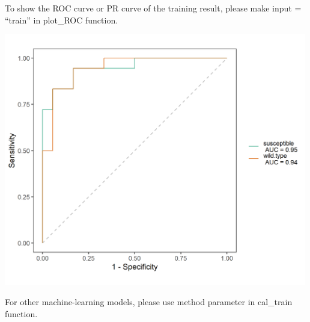 \documentclass[
]{book}
\newenvironment{Shaded}{\begin{snugshade}}{\end{snugshade}}
\newcommand{\AttributeTok}[1]{\textcolor[rgb]{0.77,0.63,0.00}{#1}}
\newcommand{\CommentTok}[1]{\textcolor[rgb]{0.56,0.35,0.01}{\textit{#1}}}
\newcommand{\DecValTok}[1]{\textcolor[rgb]{0.00,0.00,0.81}{#1}}
\newcommand{\FloatTok}[1]{\textcolor[rgb]{0.00,0.00,0.81}{#1}}
\newcommand{\FunctionTok}[1]{\textcolor[rgb]{0.00,0.00,0.00}{#1}}
\newcommand{\NormalTok}[1]{#1}
\newcommand{\SpecialCharTok}[1]{\textcolor[rgb]{0.00,0.00,0.00}{#1}}
\newcommand{\StringTok}[1]{\textcolor[rgb]{0.31,0.60,0.02}{#1}}
\begin{document}
To show the ROC curve or PR curve of the training result, please make input = ``train'' in plot\_ROC function.

\begin{Shaded}
\end{Shaded}

\begin{center}\includegraphics[width=500px]{Images/plot_ROC_with_selection_training} \end{center}

For other machine-learning models, please use method parameter in cal\_train function.

\begin{Shaded}
\end{Shaded}
\end{document}
